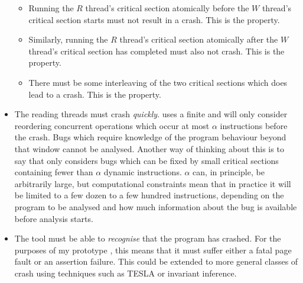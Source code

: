 \begin{itemize}
  \begin{itemize}
  \item Running the $R$ thread's critical section atomically before
    the $W$ thread's critical section starts must not result in a
    crash.  This is the  property.
  \item Similarly, running the $R$ thread's critical section
    atomically after the $W$ thread's critical section has completed
    must also not crash.  This is the 
    property.
  \item There must be some interleaving of the two critical sections
    which does lead to a crash.  This is the  property.
  \end{itemize}
\item The reading threads must crash \emph{quickly}.  {\Technique}
  uses a finite  \introduction{$\alpha$}
  and will only consider reordering concurrent operations which occur
  at most $\alpha$ instructions before the crash.  Bugs which require
  knowledge of the program behaviour beyond that window cannot be
  analysed.  Another way of thinking about this is to say that
  {\technique} only considers bugs which can be fixed by small
  critical sections containing fewer than $\alpha$ dynamic
  instructions.  $\alpha$ can, in principle, be arbitrarily large, but
  computational constraints mean that in practice it will be limited
  to a few dozen to a few hundred instructions, depending on the
  program to be analysed and how much information about the bug is
  available before analysis starts.
\item The tool must be able to \emph{recognise}
  that the program has crashed.  For the purposes of my prototype
  {\implementation}, this means that it must suffer either a fatal
  page fault or an assertion failure.  This could be extended to more
  general classes of crash using techniques such as TESLA\needCite{}
  or invariant inference\needCite{}.

\end{itemize}


